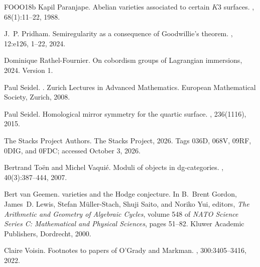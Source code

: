 \documentclass[11pt]{article}
\numberwithin{equation}{section}
\theoremstyle{definition}
\theoremstyle{remark}
\begin{document}
\begin{thebibliography}{FOOO18b}
Kapil Paranjape.
\newblock Abelian varieties associated to certain {$K3$} surfaces.
, 68(1):11--22, 1988.

J.~P. Pridham.
\newblock Semiregularity as a consequence of {Goodwillie}'s theorem.
, 12:e126, 1--22, 2024.

Dominique Rathel-Fournier.
\newblock On cobordism groups of {Lagrangian} immersions, 2024.
\newblock Version 1.

Paul Seidel.
.
\newblock Zurich Lectures in Advanced Mathematics. European Mathematical
  Society, Zurich, 2008.

Paul Seidel.
\newblock Homological mirror symmetry for the quartic surface.
, 236(1116), 2015.

{The Stacks Project Authors}.
\newblock The {Stacks Project}, 2026.
\newblock Tags 036D, 068V, 09RF, 0DIG, and 0FDC; accessed October 3, 2026.

Bertrand To{\"e}n and Michel Vaqui{\'e}.
\newblock Moduli of objects in dg-categories.
,
  40(3):387--444, 2007.

Bert {van Geemen}.
 varieties and the {Hodge} conjecture.
\newblock In B.~Brent Gordon, James~D. Lewis, Stefan M{\"u}ller-Stach, Shuji
  Saito, and Noriko Yui, editors, {\em The Arithmetic and Geometry of Algebraic
  Cycles}, volume 548 of {\em NATO Science Series C: Mathematical and Physical
  Sciences}, pages 51--82. Kluwer Academic Publishers, Dordrecht, 2000.

Claire Voisin.
\newblock Footnotes to papers of {O'Grady} and {Markman}.
, 300:3405--3416, 2022.

\end{thebibliography}
\end{document}
